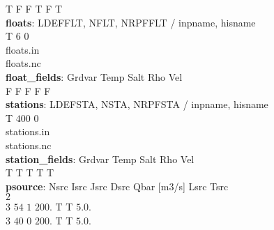                     T      F       F      T     F     T \\
\textbf{floats}: LDEFFLT, NFLT, NRPFFLT / inpname, hisname \\
           T       $6$      $0$ \\
                                   floats.in \\
                                   floats.nc \\
\textbf{float\_fields}:  Grdvar Temp Salt Rho Vel \\
                 F     F    F    F   F \\
\textbf{stations}: LDEFSTA, NSTA, NRPFSTA / inpname, hisname \\
             T      $400$      $0$ \\
                                    stations.in \\
                                    stations.nc \\
\textbf{station\_fields}:  Grdvar Temp Salt Rho Vel \\
                   T     T    T    T   T \\
\textbf{psource}:   Nsrc  Isrc  Jsrc  Dsrc  Qbar [m3/s]    Lsrc        Tsrc \\
            $2$ \\
            $3$    $54$     $1$    $200. $   T T      $5. 0.$ \\
            $3$    $40$     0    $200.$      T T      $5. 0.$ \\
 


